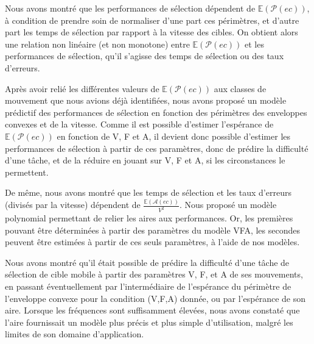 	Nous avons montré que les performances de sélection dépendent de $\mathbb{E}(\mathcal{P}(ec))$, à condition de prendre soin de normaliser d'une part ces périmètres, et d'autre part les temps de sélection par rapport à la vitesse des cibles. On obtient alors une relation non linéaire (et non monotone) entre $\mathbb{E}(\mathcal{P}(ec))$ et les performances de sélection, qu'il s'agisse des temps de sélection ou des taux d'erreurs.
	
	Après avoir relié les différentes valeurs de $\mathbb{E}(\mathcal{P}(ec))$ aux classes de mouvement que nous avions déjà identifiées, nous avons proposé un modèle prédictif des performances de sélection en fonction des périmètres des enveloppes convexes et de la vitesse. Comme il est possible d'estimer l'espérance de $\mathbb{E}(\mathcal{P}(ec))$ en fonction de V, F et A, il devient donc possible d'estimer les performances de sélection à partir de ces paramètres, donc de prédire la difficulté d'une tâche, et de la réduire en jouant sur V, F et A, si les circonstances le permettent.
	
	De même, nous avons montré que les temps de sélection et les taux d'erreurs (divisés par la vitesse) dépendent de $\frac{\mathbb{E}(\mathcal{A}(ec))}{V^{2}}$. Nous proposé un modèle polynomial permettant de relier les aires aux performances. Or, les premières pouvant être déterminées à partir des paramètres du modèle VFA, les secondes peuvent être estimées à partir de ces seuls paramètres, à l'aide de nos modèles.
	
	Nous avons montré qu'il était possible de prédire la difficulté d'une tâche de sélection de cible mobile à partir des paramètres V, F, et A de ses mouvements, en passant éventuellement par l'intermédiaire de l'espérance du périmètre de l'enveloppe convexe pour la condition (V,F,A) donnée, ou par l'espérance de son aire. Lorsque les fréquences sont suffisamment élevées, nous avons constaté que l'aire fournissait un modèle plus précis et plus simple d'utilisation, malgré les limites de son domaine d'application.

\clearpage
